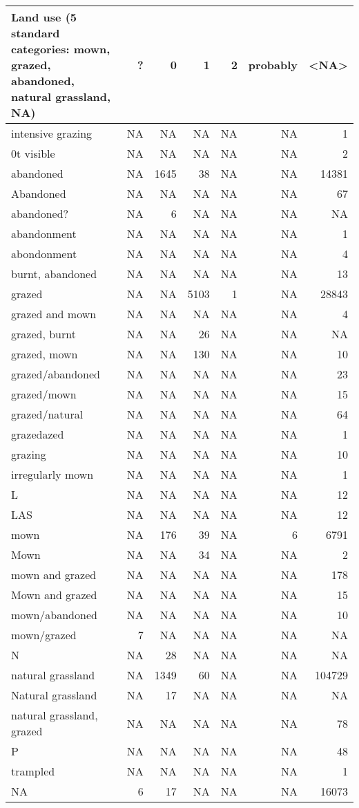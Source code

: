 \documentclass[table]{article}
\begin{document}
\begin{tabular}{>{\raggedright\arraybackslash}p{8cm}|r|r|r|r|r|r}
\hline
Land use (5 standard categories: mown, grazed, abandoned, natural grassland, NA) & ? & 0 & 1 & 2 & probably & <NA>\\
\hline
0 intensive grazing & NA & NA & NA & NA & NA & 1\\
\hline
0t visible & NA & NA & NA & NA & NA & 2\\
\hline
abandoned & NA & 1645 & 38 & NA & NA & 14381\\
\hline
Abandoned & NA & NA & NA & NA & NA & 67\\
\hline
abandoned? & NA & 6 & NA & NA & NA & NA\\
\hline
abandonment & NA & NA & NA & NA & NA & 1\\
\hline
abondonment & NA & NA & NA & NA & NA & 4\\
\hline
burnt, abandoned & NA & NA & NA & NA & NA & 13\\
\hline
grazed & NA & NA & 5103 & 1 & NA & 28843\\
\hline
grazed and mown & NA & NA & NA & NA & NA & 4\\
\hline
grazed, burnt & NA & NA & 26 & NA & NA & NA\\
\hline
grazed, mown & NA & NA & 130 & NA & NA & 10\\
\hline
grazed/abandoned & NA & NA & NA & NA & NA & 23\\
\hline
grazed/mown & NA & NA & NA & NA & NA & 15\\
\hline
grazed/natural & NA & NA & NA & NA & NA & 64\\
\hline
grazedazed & NA & NA & NA & NA & NA & 1\\
\hline
grazing & NA & NA & NA & NA & NA & 10\\
\hline
irregularly mown & NA & NA & NA & NA & NA & 1\\
\hline
L & NA & NA & NA & NA & NA & 12\\
\hline
LAS & NA & NA & NA & NA & NA & 12\\
\hline
mown & NA & 176 & 39 & NA & 6 & 6791\\
\hline
Mown & NA & NA & 34 & NA & NA & 2\\
\hline
mown and grazed & NA & NA & NA & NA & NA & 178\\
\hline
Mown and grazed & NA & NA & NA & NA & NA & 15\\
\hline
mown/abandoned & NA & NA & NA & NA & NA & 10\\
\hline
mown/grazed & 7 & NA & NA & NA & NA & NA\\
\hline
N & NA & 28 & NA & NA & NA & NA\\
\hline
natural grassland & NA & 1349 & 60 & NA & NA & 104729\\
\hline
Natural grassland & NA & 17 & NA & NA & NA & NA\\
\hline
natural grassland, grazed & NA & NA & NA & NA & NA & 78\\
\hline
P & NA & NA & NA & NA & NA & 48\\
\hline
trampled & NA & NA & NA & NA & NA & 1\\
\hline
NA & 6 & 17 & NA & NA & NA & 16073\\
\hline
\end{tabular}
\end{document}

